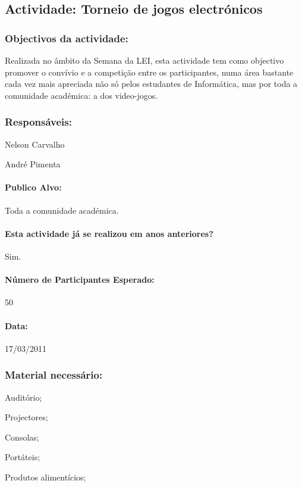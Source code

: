 \subsection{Actividade: Torneio de jogos electrónicos} 

\subsubsection*{Objectivos da actividade:}
Realizada no âmbito da Semana da LEI, esta actividade tem como objectivo promover o convívio e a competição entre os participantes, numa área bastante cada vez mais apreciada não só pelos estudantes de Informática, mas por toda a comunidade académica: a dos video-jogos.

\subsubsection*{Responsáveis:}
\begin{itemizedash}
	\item{Nelson Carvalho}
	\item{André Pimenta}
\end{itemizedash}

\paragraph{Publico Alvo: }
Toda a comunidade académica.

\paragraph{Esta actividade já se realizou em anos anteriores?}
Sim.

\paragraph{Número de Participantes Esperado:}
50

\paragraph{Data:} 17/03/2011

\subsubsection*{Material necessário:}
\begin{itemizedash}
	\item{Auditório;}
	\item{Projectores;}
	\item{Consolas;}
	\item{Portáteis;}
	\item{Produtos alimentícios;}
\end{itemizedash}

